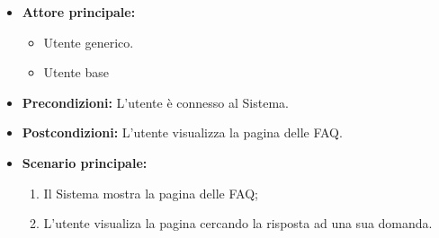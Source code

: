 \label{usecase:Visualizzazione FAQ}
\begin{itemize}
	\item \textbf{Attore principale:} 
    \begin{itemize}
        \item Utente generico.
        \item Utente base
    \end{itemize}

	\item \textbf{Precondizioni:}
	      L'utente è connesso al Sistema.

	\item \textbf{Postcondizioni:} L'utente visualizza la pagina delle FAQ.

	\item \textbf{Scenario principale:}
	      \begin{enumerate}
              \item Il Sistema mostra la pagina delle FAQ;
              \item L'utente visualiza la pagina cercando la risposta ad una sua domanda.
		    
	      \end{enumerate}
\end{itemize}